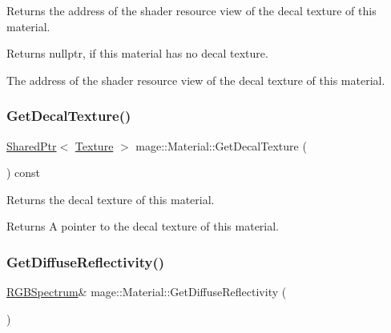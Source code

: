 Returns the address of the shader resource view of the decal texture of this material.

\begin{DoxyReturn}{Returns}
{\ttfamily nullptr}, if this material has no decal texture. 

The address of the shader resource view of the decal texture of this material. 
\end{DoxyReturn}
\hypertarget{structmage_1_1_material_a7cf62e3f72b74c945e3d5c47c2c73485}{}\label{structmage_1_1_material_a7cf62e3f72b74c945e3d5c47c2c73485} 
\subsubsection{\texorpdfstring{Get\+Decal\+Texture()}{GetDecalTexture()}}
{\footnotesize\ttfamily \hyperlink{namespacemage_a1e01ae66713838a7a67d30e44c67703e}{Shared\+Ptr}$<$ \hyperlink{classmage_1_1_texture}{Texture} $>$ mage\+::\+Material\+::\+Get\+Decal\+Texture (\begin{DoxyParamCaption}{ }\end{DoxyParamCaption}) const\hspace{0.3cm}{\ttfamily [noexcept]}}

Returns the decal texture of this material.

\begin{DoxyReturn}{Returns}
A pointer to the decal texture of this material. 
\end{DoxyReturn}
\hypertarget{structmage_1_1_material_afb37e1cd37df82b6607a4e5998e58ea8}{}\label{structmage_1_1_material_afb37e1cd37df82b6607a4e5998e58ea8} 
\subsubsection{\texorpdfstring{Get\+Diffuse\+Reflectivity()}{GetDiffuseReflectivity()}\hspace{0.1cm}{\footnotesize\ttfamily [1/2]}}
{\footnotesize\ttfamily \hyperlink{structmage_1_1_r_g_b_spectrum}{R\+G\+B\+Spectrum}\& mage\+::\+Material\+::\+Get\+Diffuse\+Reflectivity (\begin{DoxyParamCaption}{ }\end{DoxyParamCaption})\hspace{0.3cm}{\ttfamily [noexcept]}}

